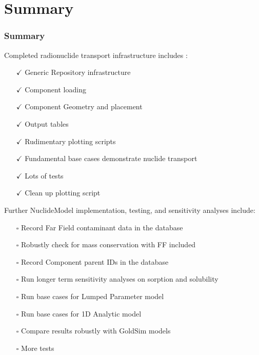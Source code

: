 \section{Summary}
\begin{frame}[ctb!]
  \frametitle{Summary}
  Completed radionuclide transport infrastructure includes :
  \begin{itemize}
  \item[$\checkmark$] Generic Repository infrastructure 
  \item[$\checkmark$] Component loading
  \item[$\checkmark$] Component Geometry and placement
  \item[$\checkmark$] Output tables
  \item[$\checkmark$] Rudimentary plotting scripts
  \item[$\checkmark$] Fundamental base cases demonstrate nuclide transport 
  \item[$\checkmark$] Lots of tests
  \item[$\checkmark$] Clean up plotting script 
  \end{itemize}
  Further NuclideModel implementation, testing, and sensitivity analyses 
  include:
  \begin{itemize}
  \item[$\square$] Record Far Field contaminant data in the database 
  \item[$\square$] Robustly check for mass conservation with FF included 
  \item[$\square$] Record Component parent IDs in the database
  \item[$\square$] Run longer term sensitivity analyses on sorption and solubility 
  \item[$\square$] Run base cases for Lumped Parameter model
  \item[$\square$] Run base cases for 1D Analytic model
  \item[$\square$] Compare results robustly with GoldSim models
  \item[$\square$] More tests
  \end{itemize}

\end{frame}

